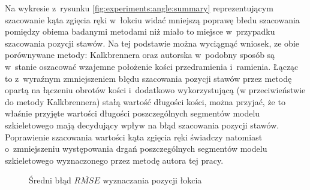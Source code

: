 Na wykresie z~rysunku \ref{fig:experiments:angle:summary} reprezentującym szacowanie kąta zgięcia ręki w~łokciu widać mniejszą poprawę błedu szacowania pomiędzy obiema badanymi metodami niż miało to miejsce w~przypadku szacowania pozycji stawów. 
Na tej podstawie można wyciągnąć wniosek, ze obie porównywane metody: Kalkbrennera oraz autorska w~podobny sposób są w~stanie oszacować wzajemne położenie kości przedramienia i~ramienia. Łącząc to z~wyraźnym zmniejszeniem błędu szacowania pozycji stawów przez metodę opartą na łączeniu obrotów kości i~dodatkowo wykorzystującą (w przeciwieństwie do metody Kalkbrennera) stałą wartość długości kości, można przyjać, że to właśnie przyjęte wartości długości poszczególnych segmentów modelu szkieletowego mają decydujący wpływ na błąd szacowania pozycji stawów. Poprawienie szacowania wartości kąta zgięcia ręki świadczy natomiast o~zmniejszeniu występowania drgań poszczególnych segmentów modelu szkieletowego wyznaczonego przez metodę autora tej pracy.


\pgfplotsset{width=12cm,compat=1.8}
\begin{figure}[!htb]
	\centering
	\caption{Średni błąd $\overline{RMSE}$ wyznaczania pozycji łokcia}
	\label{fig:experiments:elbow:summary}
\end{figure}

